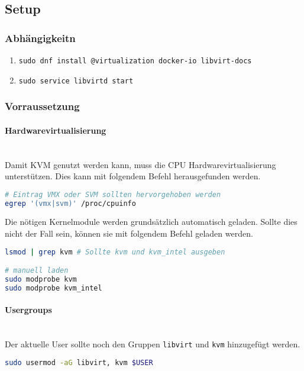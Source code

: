 \subsection{Setup}
\subsubsection{Abhängigkeitn}
\begin{enumerate}
	\item \lstinline|sudo dnf install @virtualization docker-io libvirt-docs|
	\item \lstinline|sudo service libvirtd start|
\end{enumerate}

\subsubsection{Vorraussetzung}
\paragraph{Hardwarevirtualisierung} \hfill \\
Damit KVM genutzt werden kann, muss die CPU Hardwarevirtualisierung unterstützen. Dies kann mit folgendem Befehl herausgefunden werden.
\begin{lstlisting}[language=bash]
# Eintrag VMX oder SVM sollten hervorgehoben werden
egrep '(vmx|svm)' /proc/cpuinfo
\end{lstlisting}

Die nötigen Kernelmodule werden grundsätzlich automatisch geladen. Sollte dies nicht der Fall sein, können sie mit folgendem Befehl geladen werden.
\begin{lstlisting}[language=bash]
lsmod | grep kvm # Sollte kvm und kvm_intel ausgeben 

# manuell laden
sudo modprobe kvm
sudo modprobe kvm_intel
\end{lstlisting}

\paragraph{Usergroups} \hfill \\
Der aktuelle User sollte noch den Gruppen \lstinline|libvirt| und \lstinline|kvm| hinzugefügt werden.
\begin{lstlisting}[language=bash]
sudo usermod -aG libvirt, kvm $USER
\end{lstlisting}





